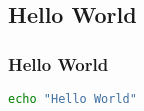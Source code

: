 \subsection{Hello World}
\subsubsection{Hello World}


\begin{lstlisting}[inputencoding={utf8}, extendedchars=false, escapeinside='', language=bash, caption=Hello World]
echo "Hello World"
\end{lstlisting}




\clearpage
